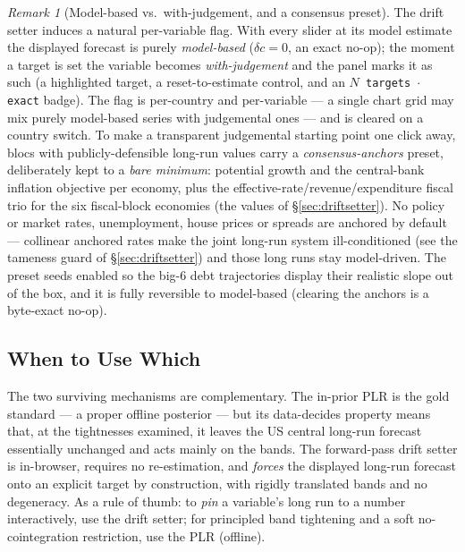 \documentclass[11pt]{article}
\theoremstyle{definition}
\theoremstyle{remark}
\newtheorem{remark}{Remark}
\begin{document}
\begin{remark}[Model-based vs.\ with-judgement, and a consensus preset]
\label{rem:judgement_consensus}
The drift setter induces a natural per-variable flag. With every slider at
its model estimate the displayed forecast is purely \emph{model-based}
($\delta c=0$, an exact no-op); the moment a target is set the variable
becomes \emph{with-judgement} and the panel marks it as such (a highlighted
target, a reset-to-estimate control, and an \texttt{$N$ targets $\cdot$
exact} badge). The flag is per-country and per-variable --- a single chart
grid may mix purely model-based series with judgemental ones --- and is
cleared on a country switch. To make a transparent judgemental starting
point one click away, blocs with publicly-defensible long-run values carry
a \emph{consensus-anchors} preset, deliberately kept to a \emph{bare
minimum}: potential growth and the central-bank inflation objective per
economy, plus the effective-rate/revenue/expenditure fiscal trio for the
six fiscal-block economies (the values of \S\ref{sec:driftsetter}). No
policy or market rates, unemployment, house prices or spreads are anchored
by default --- collinear anchored rates make the joint long-run system
ill-conditioned (see the tameness guard of \S\ref{sec:driftsetter}) and
those long runs stay model-driven. The preset seeds enabled so the big-6
debt trajectories display their realistic slope out of the box, and it is
fully reversible to model-based (clearing the anchors is a byte-exact
no-op).
\end{remark}

\subsection{When to Use Which}\label{sec:plr_vs_tilt_choice}

The two surviving mechanisms are complementary. The in-prior PLR is the
gold standard --- a proper offline posterior --- but its
data-decides property means that, at the tightnesses examined, it leaves
the US central long-run forecast essentially unchanged and acts mainly on
the bands. The forward-pass drift setter is in-browser, requires no
re-estimation, and \emph{forces} the displayed long-run forecast onto an
explicit target by construction, with rigidly translated bands and no
degeneracy. As a rule of thumb: to \emph{pin} a variable's long run to a
number interactively, use the drift setter; for principled band
tightening and a soft no-cointegration restriction, use the PLR (offline).
\end{document}
